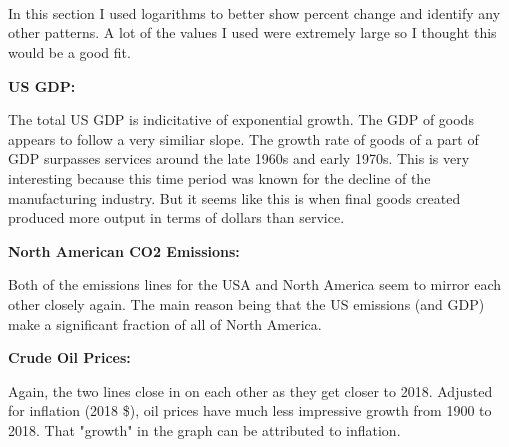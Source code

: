 \documentclass[11pt]{article}
\begin{document}
    \begin{center}
    \end{center}
    { \hspace*{\fill} \\}
    
    \begin{center}
    \end{center}
    { \hspace*{\fill} \\}
    
    \begin{center}
    \end{center}
    { \hspace*{\fill} \\}
    
    In this section I used logarithms to better show percent change and
identify any other patterns. A lot of the values I used were extremely
large so I thought this would be a good fit.

\textbf{US GDP:}

The total US GDP is indicitative of exponential growth. The GDP of goods
appears to follow a very similiar slope. The growth rate of goods of a
part of GDP surpasses services around the late 1960s and early 1970s.
This is very interesting because this time period was known for the
decline of the manufacturing industry. But it seems like this is when
final goods created produced more output in terms of dollars than
service.

\textbf{North American CO2 Emissions:}

Both of the emissions lines for the USA and North America seem to mirror
each other closely again. The main reason being that the US emissions
(and GDP) make a significant fraction of all of North America.

\textbf{Crude Oil Prices:}

Again, the two lines close in on each other as they get closer to 2018.
Adjusted for inflation (2018 \$), oil prices have much less impressive
growth from 1900 to 2018. That "growth" in the graph can be attributed
to inflation.
\end{document}
